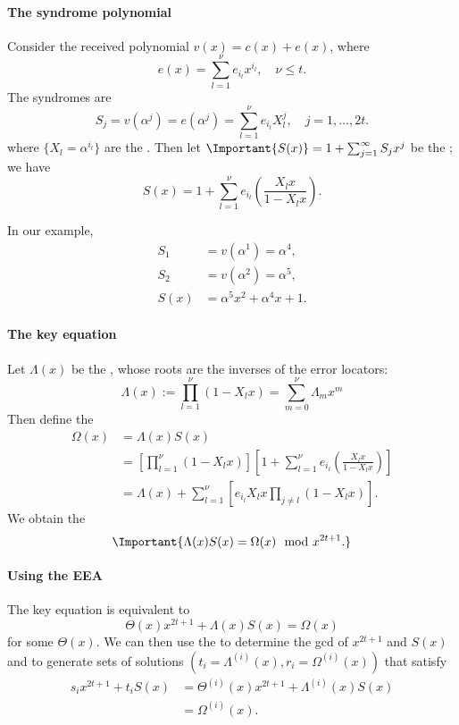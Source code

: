 \documentclass[a4paper, 11pt, openany]{book}
\begin{document}
\paragraph{The syndrome polynomial}
Consider the received polynomial $v(x) = c(x) + e(x)$, where
\[
	e(x) = \sum_{l=1}^\nu e_{i_l} x^{i_l}, \quad \nu \le t.
\]
The syndromes are
\[
	S_j = v(\alpha^j) = e(\alpha^j) = \sum_{l=1}^\nu e_{i_l} X_l^j, \quad j = 1, \dots, 2t.
\]
where $\{X_l = \alpha^{i_l}\}$ are the . Then let $\Important{S(x)} = 1 + \sum_{j=1}^\infty S_j x^j$ be the ; we have
\[
	S(x) = 1 + \sum_{l=1}^\nu e_{i_l} \left( \frac {X_l x} {1 - X_l x} \right).
\]

In our example,
\begin{align*}
    S_1 &= v(\alpha^1) = \alpha^4,\\
    S_2 &= v(\alpha^2) = \alpha^5,\\
    S(x) &= \alpha^5 x^2 + \alpha^4 x + 1.
\end{align*}



\paragraph{The key equation}
Let $\Lambda(x)$ be the , whose roots are the inverses of the error locators:
\[
	\Lambda(x) := \prod_{l=1}^\nu (1 - X_l x) = \sum_{m = 0}^\nu \Lambda_m x^m
\]
Then define the 
\begin{align*}
	\Omega(x) &= \Lambda(x) S(x)\\
	&= \left[ \prod_{l=1}^\nu (1 - X_l x) \right] \left[ 1 + \sum_{l=1}^\nu e_{i_l} \left( \frac {X_l x} {1 - X_l x} \right) \right]\\
	&= \Lambda(x) + \sum_{l=1}^\nu \left[ e_{i_l} X_l x \prod_{j \ne l} (1 - X_l x) \right].
\end{align*}
We obtain the 
\[
	\Important{\Lambda(x) S(x) = \Omega(x) \mod x^{2t+1}.}
\]


\paragraph{Using the EEA}
The key equation is equivalent to
$$
	\Theta(x) x^{2t+1} + \Lambda(x) S(x) = \Omega(x)
$$
for some $\Theta(x)$. We can then use the  to determine the gcd of $x^{2t+1}$ and $S(x)$ and to generate sets of solutions $(t_i = \Lambda^{(i)}(x), r_i = \Omega^{(i)}(x))$ that satisfy
\begin{align*}
	s_i x^{2t+1} + t_i S(x) &= \Theta^{(i)}(x) x^{2t+1} + \Lambda^{(i)}(x) S(x)\\
	&= \Omega^{(i)}(x).
\end{align*}
\end{document}
